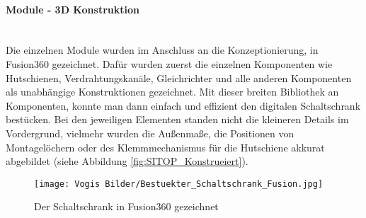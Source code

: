     \paragraph{Module - 3D Konstruktion}\mbox{}\\
    Die einzelnen Module wurden im Anschluss an die Konzeptionierung, in Fusion360 gezeichnet. Dafür wurden zuerst die einzelnen Komponenten wie Hutschienen, Verdrahtungskanäle, Gleichrichter und alle anderen Komponenten als unabhängige Konstruktionen gezeichnet. Mit dieser breiten Bibliothek an Komponenten, konnte man dann einfach und effizient den digitalen Schaltschrank bestücken. Bei den jeweiligen Elementen standen nicht die kleineren Details im Vordergrund, vielmehr wurden die Außenmaße, die Positionen von Montagelöchern oder des Klemmmechanismus für die Hutschiene akkurat abgebildet (siehe Abbildung \ref{fig:SITOP_Konstrueiert}).
    \begin{figure}[h]
        \centering
        \texttt{[image: Vogis Bilder/Bestuekter\_Schaltschrank\_Fusion.jpg]}
        \caption{Der Schaltschrank in Fusion360 gezeichnet}
        \label{fig:Schaltschrank_bestueckt_Fusion}
    \end{figure}
